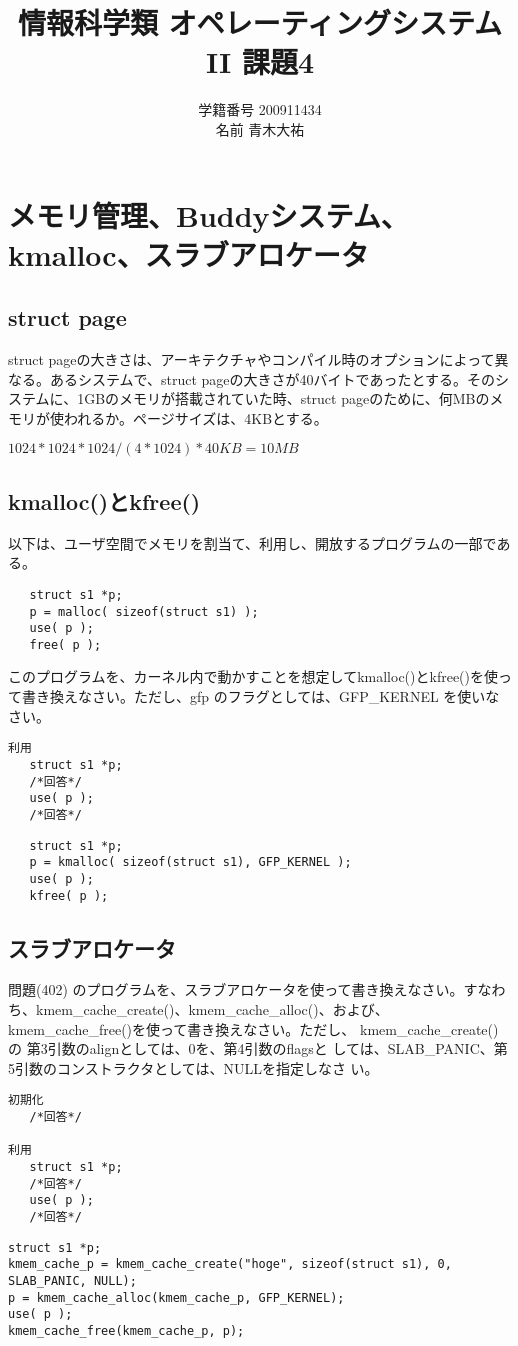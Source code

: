 \documentclass[a4j,9pt]{jsarticle}
\title{情報科学類 オペレーティングシステムII 課題4}
\author{学籍番号 200911434 \\ 名前 青木大祐}
\begin{document}
\maketitle
\setcounter{section}{3}
\section{メモリ管理、Buddyシステム、kmalloc、スラブアロケータ}
\setcounter{subsection}{400}
\subsection{struct page}
\begin{screen}
struct pageの大きさは、アーキテクチャやコンパイル時のオプションによって異なる。あるシステムで、struct pageの大きさが40バイトであったとする。そのシステムに、1GBのメモリが搭載されていた時、struct pageのために、何MBのメモリが使われるか。ページサイズは、4KBとする。
\end{screen}
$1024*1024*1024/(4*1024) * 40KB = 10MB$


\subsection{kmalloc()とkfree()}
\begin{screen}
以下は、ユーザ空間でメモリを割当て、利用し、開放するプログラムの一部である。
\begin{lstlisting}
   struct s1 *p;
   p = malloc( sizeof(struct s1) );
   use( p );
   free( p ); 
\end{lstlisting}
このプログラムを、カーネル内で動かすことを想定してkmalloc()とkfree()を使って書き換えなさい。ただし、gfp のフラグとしては、GFP\_KERNEL を使いなさい。
\begin{lstlisting}
利用
   struct s1 *p;
   /*回答*/
   use( p );
   /*回答*/ 
\end{lstlisting}
\end{screen}

\begin{lstlisting}
   struct s1 *p;
   p = kmalloc( sizeof(struct s1), GFP_KERNEL );
   use( p );
   kfree( p );
\end{lstlisting}

\subsection{スラブアロケータ}
\begin{screen}
問題(402) のプログラムを、スラブアロケータを使って書き換えなさい。すなわ
 ち、kmem\_cache\_create()、kmem\_cache\_alloc()、および、
 kmem\_cache\_free()を使って書き換えなさい。ただし、
 kmem\_cache\_create() の 第3引数のalignとしては、0を、第4引数のflagsと
 しては、SLAB\_PANIC、第5引数のコンストラクタとしては、NULLを指定しなさ
 い。

\begin{lstlisting}
初期化
   /*回答*/

利用
   struct s1 *p;
   /*回答*/
   use( p );
   /*回答*/
\end{lstlisting}
\end{screen}

\begin{lstlisting}
struct s1 *p;
kmem_cache_p = kmem_cache_create("hoge", sizeof(struct s1), 0, SLAB_PANIC, NULL);
p = kmem_cache_alloc(kmem_cache_p, GFP_KERNEL);
use( p );
kmem_cache_free(kmem_cache_p, p);
\end{lstlisting}
\end{document}

